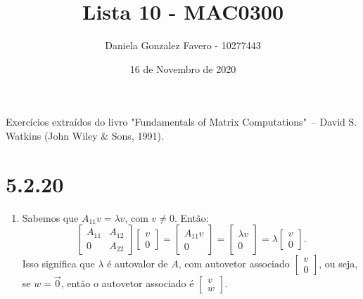 \documentclass[a4paper,11pt]{article}
\title{Lista 10 - MAC0300}
\author{Daniela Gonzalez Favero - 10277443}
\date{16 de Novembro de 2020}
\begin{document}
    \maketitle
    
    Exercícios extraídos do livro "Fundamentals of Matrix Computations"\ – David S. Watkins (John Wiley \& Sons, 1991).
    \section*{5.2.20}
        \begin{enumerate}[label=\textbf{(\alph*)}]
            \item Sabemos que $A_{11}v = \lambda v $, com $v \neq 0$. Então:
                $$
                    \begin{bmatrix}
                        A_{11} & A_{12} \\
                        0 & A_{22}
                    \end{bmatrix}
                    \begin{bmatrix}
                        v \\
                        0
                    \end{bmatrix}
                    =
                    \begin{bmatrix}
                        A_{11}v \\
                        0
                    \end{bmatrix}
                    =
                    \begin{bmatrix}
                        \lambda v \\
                        0
                    \end{bmatrix}
                    =
                    \lambda
                    \begin{bmatrix}
                        v \\
                        0
                    \end{bmatrix}.
                $$
                    Isso significa que $\lambda$ é autovalor de $A$, com autovetor associado $\begin{bmatrix} v \\ 0 \end{bmatrix}$, ou seja, se $w = \vec{0}$, então o autovetor associado é $\begin{bmatrix} v \\ w \end{bmatrix}$.
                    

\end{enumerate}
\end{document}
